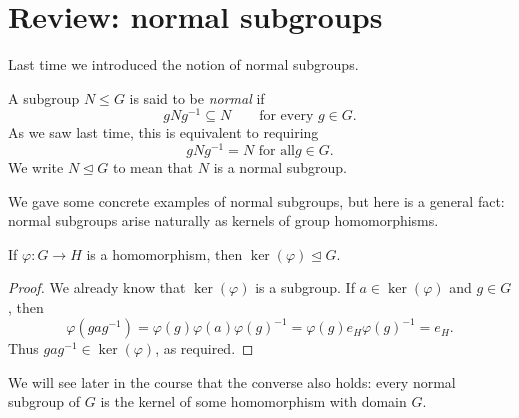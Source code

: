 \documentclass[reqno,11pt]{amsart}
\begin{document}
\makelecturetitle

\section{Review: normal subgroups}

Last time we introduced the notion of normal subgroups.

\begin{define}
A subgroup $N\leq G$ is said to be \emph{normal} if
\[
  gNg^{-1}\subseteq N\qquad\text{for every }g\in G.
\]
As we saw last time, this is equivalent to requiring $$gNg^{-1}=N \text{ for all} g\in G.$$
We write $N\trianglelefteq G$ to mean that $N$ is a normal subgroup.
\end{define}

%
%
%

We gave some concrete examples of normal subgroups, but here is a general
fact: normal subgroups arise naturally as kernels of group homomorphisms.

\begin{proposition}\label{prop:kernel-normal}
	If $\varphi:G\to H$ is a homomorphism, then $\ker(\varphi)\trianglelefteq G$.
\end{proposition}
\begin{proof}
	We already know that $\ker(\varphi)$ is a subgroup. If $a\in\ker(\varphi)$
	and $g\in G$, then
	\[
	\varphi(gag^{-1})
	=\varphi(g)\varphi(a)\varphi(g)^{-1}
	=\varphi(g)e_H\varphi(g)^{-1}=e_H.
	\]
	Thus $gag^{-1}\in\ker(\varphi)$, as required.
\end{proof}

We will see later in the course that the converse also holds: every normal
subgroup of $G$ is the kernel of some homomorphism with domain $G$. 
\end{document}
